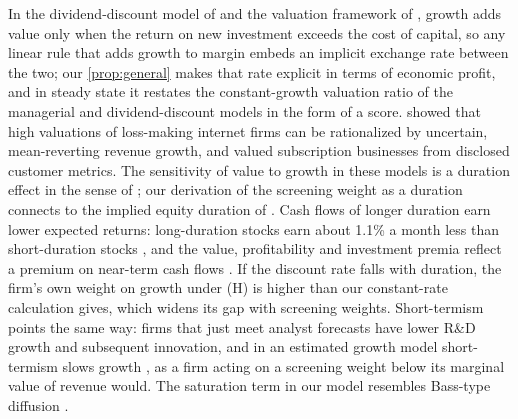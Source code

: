 {\sloppy In the dividend-discount model of \citet{gordon1959dividends,gordon1962investment} and the valuation framework of \citet{miller1961dividend}, growth adds value only when the return on new investment exceeds the cost of capital, so any linear rule that adds growth to margin embeds an implicit exchange rate between the two; our \autoref{prop:general} makes that rate explicit in terms of economic profit, and in steady state it restates the constant-growth valuation ratio of the managerial and dividend-discount models \citep{marris1963model,gordon1962investment} in the form of a score. \citet{schwartz2000rational} showed that high valuations of loss-making internet firms can be rationalized by uncertain, mean-reverting revenue growth, and \citet{mccarthy2017valuing} valued subscription businesses from disclosed customer metrics. The sensitivity of value to growth in these models is a duration effect in the sense of \citet{macaulay1938some}; our derivation of the screening weight as a duration connects to the implied equity duration of \citet{dechow2004implied}. Cash flows of longer duration earn lower expected returns: long-duration stocks earn about 1.1\% a month less than short-duration stocks \citep{weber2018cash}, and the value, profitability and investment premia reflect a premium on near-term cash flows \citep{gormsen2023duration}. If the discount rate falls with duration, the firm's own weight on growth under (H) is higher than our constant-rate calculation gives, which widens its gap with screening weights. Short-termism points the same way: firms that just meet analyst forecasts have lower R\&D growth and subsequent innovation, and in an estimated growth model short-termism slows growth \citep{terry2023macro}, as a firm acting on a screening weight below its marginal value of revenue would. The saturation term in our model resembles Bass-type diffusion \citep{bass1969new}.\par}

